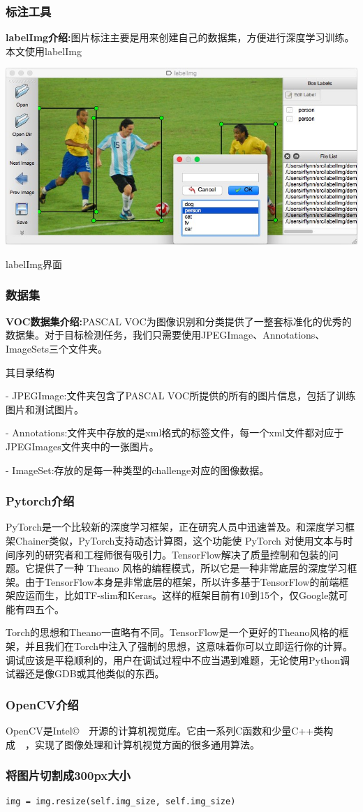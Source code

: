 \subsubsection{标注工具}
\textbf{labelImg介绍:}图片标注主要是用来创建自己的数据集，方便进行深度学习训练。本文使用labelImg
\begin{uscfigure}
	\includegraphics[width=\textwidth]{./Pictures/labelimg.jpg}	
	\caption{labelImg界面}
\end{uscfigure}
\subsubsection{数据集}
\textbf{VOC数据集介绍:}PASCAL VOC为图像识别和分类提供了一整套标准化的优秀的数据集。对于目标检测任务，我们只需要使用JPEGImage、Annotations、ImageSets三个文件夹。

其目录结构

- JPEGImage:文件夹包含了PASCAL VOC所提供的所有的图片信息，包括了训练图片和测试图片。

- Annotations:文件夹中存放的是xml格式的标签文件，每一个xml文件都对应于JPEGImages文件夹中的一张图片。

- ImageSet:存放的是每一种类型的challenge对应的图像数据。


\subsubsection{Pytorch介绍}
PyTorch是一个比较新的深度学习框架，正在研究人员中迅速普及。和深度学习框架Chainer类似，PyTorch支持动态计算图，这个功能使 PyTorch 对使用文本与时间序列的研究者和工程师很有吸引力。TensorFlow解决了质量控制和包装的问题。它提供了一种 Theano 风格的编程模式，所以它是一种非常底层的深度学习框架。由于TensorFlow本身是非常底层的框架，所以许多基于TensorFlow的前端框架应运而生，比如TF-slim和Keras。这样的框架目前有10到15个，仅Google就可能有四五个。

Torch的思想和Theano一直略有不同。TensorFlow是一个更好的Theano风格的框架，并且我们在Torch中注入了强制的思想，这意味着你可以立即运行你的计算。调试应该是平稳顺利的，用户在调试过程中不应当遇到难题，无论使用Python调试器还是像GDB或其他类似的东西。
\subsubsection{OpenCV介绍}
OpenCV是Intel\copyright　开源的计算机视觉库。它由一系列C函数和少量C++类构成　，实现了图像处理和计算机视觉方面的很多通用算法。
\subsubsection{将图片切割成300px大小}
\begin{lstlisting}[caption={图像切割}]
img = img.resize(self.img_size, self.img_size)
\end{lstlisting}
